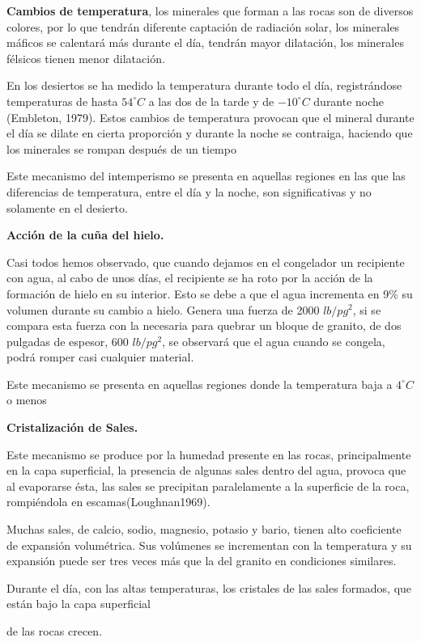 \textbf{Cambios de temperatura}, los minerales que forman a las rocas son de diversos colores, por lo que tendrán diferente captación de radiación solar, los minerales máficos se calentará más durante el día, tendrán mayor dilatación, los minerales félsicos tienen menor dilatación.

En los desiertos se ha medido la temperatura durante todo el día, registrándose temperaturas de hasta $54^{\circ}C$ a las dos de la tarde y de $-10^{\circ}C$ durante noche (Embleton, 1979). Estos cambios de temperatura provocan que el mineral durante el día se dilate en cierta proporción y durante la noche se contraiga, haciendo que los minerales se rompan después de un tiempo

Este mecanismo del intemperismo se presenta en aquellas regiones en las que las diferencias de temperatura, entre el día y la noche, son significativas y no solamente en el desierto.

\textbf{Acción de la cuña del hielo.}

Casi todos hemos observado, que cuando dejamos en el congelador un recipiente con agua, al cabo de unos días, el recipiente se ha roto por la acción de la formación de hielo en su interior. Esto se debe a que el agua incrementa en 9\% su volumen durante su cambio a hielo. Genera una fuerza de 2000 $lb/pg^2$, si se compara esta fuerza con la necesaria para quebrar un bloque de granito, de dos pulgadas de espesor, 600 $lb/pg^2$, se observará que el agua cuando se congela, podrá romper casi cualquier material.

Este mecanismo se presenta en aquellas regiones donde la temperatura baja a $4^{\circ}C$ o menos

\textbf{Cristalización de Sales.}

Este mecanismo se produce por la humedad presente en las rocas, principalmente en la capa superficial, la presencia de algunas sales dentro del agua, provoca que al evaporarse ésta, las sales se precipitan paralelamente a la superficie de la roca, rompiéndola en escamas(Loughnan1969).

Muchas sales, de calcio, sodio, magnesio, potasio y bario, tienen alto coeficiente de expansión volumétrica. Sus volúmenes se incrementan con la temperatura y su expansión puede ser tres veces más que la del granito en condiciones similares.

Durante el día, con las altas temperaturas, los cristales de las sales formados, que están bajo la capa superficial

de las rocas crecen.

